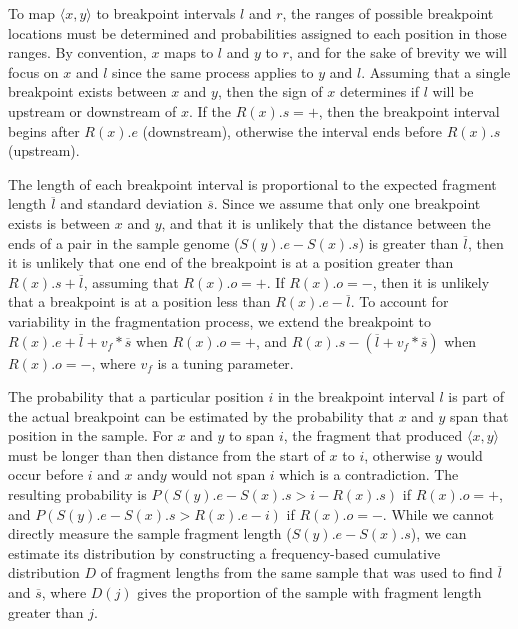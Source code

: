 \documentclass[11pt]{article}
\begin{document}
To map $\langle x,y \rangle$ to breakpoint intervals $l$ and $r$, the ranges of
possible breakpoint locations must be determined and probabilities assigned to
each position in those ranges.  By convention, $x$ maps to $l$ and $y$ to
$r$, and for the sake of brevity we will focus on $x$ and $l$ since the same
process applies to $y$ and $l$.  Assuming that a single breakpoint exists
between $x$ and $y$, then the sign of $x$ determines if $l$ will be upstream
or downstream of $x$.  If the $R(x).s=+$, then the breakpoint interval begins
after $R(x).e$ (downstream), otherwise the interval ends before $R(x).s$
(upstream).  

The length of each breakpoint interval is proportional to the expected fragment
length $\overline{l}$ and standard deviation $\overline{s}$.  Since we assume
that only one breakpoint exists is between $x$ and $y$, and that it is unlikely
that the distance between the ends of a pair in the sample genome ($S(y).e -
S(x).s$) is greater than $\overline{l}$, then it is unlikely that one end of the
breakpoint is at a position greater than $R(x).s + \overline{l}$, assuming that
$R(x).o=+$. If $R(x).o=-$, then it is unlikely that a breakpoint is at a
position less than $R(x).e - \overline{l}$.  To account for variability in the
fragmentation process, we extend the breakpoint to 
$R(x).e + \overline{l} + v_f*\overline{s}$ when $R(x).o=+$, and 
$R(x).s - (\overline{l} + v_f*\overline{s})$ when $R(x).o=-$, 
where $v_f$ is a tuning parameter.  

The probability that a particular position $i$ in the breakpoint interval $l$ is
part of the actual breakpoint can be estimated by the probability that $x$ and
$y$ span that position in the sample. For $x$ and $y$ to span $i$, the fragment
that produced $\langle x,y \rangle$ must be longer than then distance from the
start of $x$ to $i$, otherwise $y$ would occur before $i$ and $x$ and$y$ would
not span $i$ which is a contradiction.  The resulting probability is 
$P(S(y).e - S(x).s > i - R(x).s)$ if $R(x).o=+$, and 
$P(S(y).e - S(x).s > R(x).e - i)$ if $R(x).o=-$.
While we cannot directly measure the sample fragment length ($S(y).e - S(x).s$),
we can estimate its distribution by constructing a frequency-based cumulative
distribution $D$ of fragment lengths from the same sample that was used to find
$\overline{l}$ and $\overline{s}$, where $D(j)$ gives the proportion of the
sample with fragment length greater than $j$.
\end{document}
